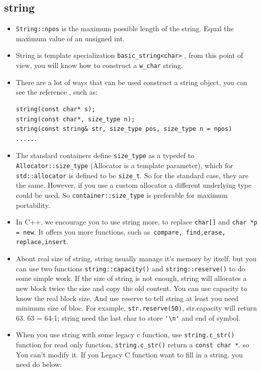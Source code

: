 \documentclass[a4paper,11pt,twoside]{book}
\begin{document}
\subsection{string}
\begin{itemize}
	\item \texttt{String::npos} is the maximum possible length of the string. Equal the maximum value of an unsigned int.
	
	\item String is template specialization \texttt{basic\_string<char>} , from this point of view, you will know how to construct a \texttt{w\_char} string.
	
	\item There are a lot of ways that can be used construct a string object, you can see the reference , such as:
\begin{lstlisting}[numbers=none]
string(const char* s);
string(const char*, size_type n);
string(const string& str, size_type pos, size_type n = npos)
......
\end{lstlisting}
	
	\item The standard containers define \texttt{size\_type} as a typedef to \texttt{Allocator::size\_type} (Allocator is a template parameter), which for \texttt{std::allocator} is defined to be \texttt{size\_t}. So for the standard case, they are the same. However, if you use a custom allocator a different underlying type could be used. So \texttt{container::size\_type} is preferable for maximum portability.
	
	\item In C++, we encourage you to use string more, to replace \texttt{char[]} and \texttt{char *p = new}.  It offers you more functions, such as\texttt{ compare, find,erase, replace,insert}.
	
	\item About real size of string, string usually manage it's memory by itself, but you can use two functions \texttt{string::capacity()} and \texttt{string::reserve()} to do some simple work. If the size of string is not enough, string will allocates a new block twice the size and copy the old content. You can use capacity to know the real block size. And use reserve to tell string at least you need minimum size of bloc. For example, \texttt{str.reserve(50)},  str.capacity will return 63. 63 = 64-1; string need the last char to store \verb='\n'= and end of symbol.
	
	\item When you use string with some legacy c function, use \texttt{string.c\_str()} function for read only function, \texttt{string.c\_str()} return a \texttt{const char *}. so You can't modify it. If you Legacy C function want to fill in a string. you need do below:
	

\end{itemize}
\end{document}
